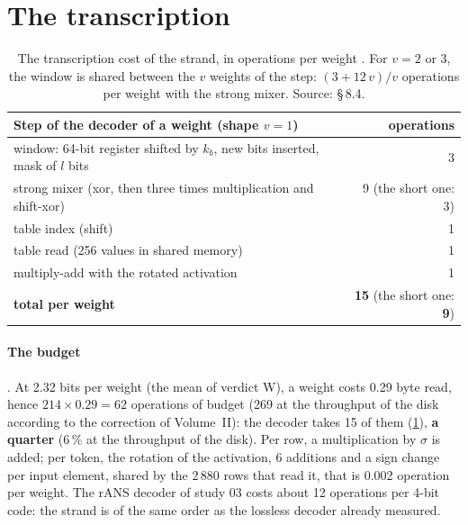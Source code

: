 \section{The transcription}\label{t3gen:sec:transcription}

\begin{table}[tbp]
\centering\small
\begin{tabular}{l r}
\toprule
Step of the decoder of a weight (shape $v = 1$) & operations \\
\midrule
window: 64-bit register shifted by $k_b$, new bits inserted, mask of $l$ bits & 3 \\
strong mixer (xor, then three times multiplication and shift-xor) & 9 (the short one: 3) \\
table index (shift) & 1 \\
table read (256 values in shared memory) & 1 \\
multiply-add with the rotated activation & 1 \\
\midrule
\textbf{total per weight} & \textbf{15} (the short one: \textbf{9}) \\
\bottomrule
\end{tabular}
\caption[The transcription cost of the strand]{The transcription cost of the strand, in operations per weight \calc. For $v = 2$ or 3, the window is shared between the $v$ weights of the step: $(3 + 12\,v)/v$ operations per weight with the strong mixer. Source:  §\,8.4.}
\label{t3gen:tab:transcription}
\end{table}

\paragraph{The budget} \calc. At 2.32 bits per weight (the mean of verdict W), a weight costs 0.29 byte read, hence $214 \times 0.29 = 62$ operations of budget (269 at the throughput of the disk according to the correction of Volume~II): the decoder takes 15 of them (\cref{t3gen:tab:transcription}), \textbf{a quarter} (6\,\% at the throughput of the disk). Per row, a multiplication by $\sigma$ is added; per token, the rotation of the activation, 6 additions and a sign change per input element, shared by the 2\,880 rows that read it, that is 0.002 operation per weight. The rANS decoder of study 03 costs about 12 operations per 4-bit code: the strand is of the same order as the lossless decoder already measured.

